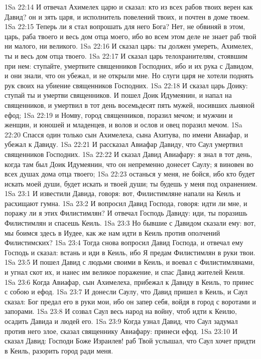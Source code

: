 1Sa 22:14  И отвечал Ахимелех царю и сказал: кто из всех рабов твоих верен как Давид? он и зять царя, и исполнитель повелений твоих, и почтен в доме твоем.
1Sa 22:15  Теперь ли я стал вопрошать для него Бога? Нет, не обвиняй в этом, царь, раба твоего и весь дом отца моего, ибо во всем этом деле не знает раб твой ни малого, ни великого.
1Sa 22:16  И сказал царь: ты должен умереть, Ахимелех, ты и весь дом отца твоего.
1Sa 22:17  И сказал царь телохранителям, стоявшим при нем: ступайте, умертвите священников Господних, ибо и их рука с Давидом, и они знали, что он убежал, и не открыли мне. Но слуги царя не хотели поднять рук своих на убиение священников Господних.
1Sa 22:18  И сказал царь Доику: ступай ты и умертви священников. И пошел Доик Идумеянин, и напал на священников, и умертвил в тот день восемьдесят пять мужей, носивших льняной ефод;
1Sa 22:19  и Номву, город священников, поразил мечом; и мужчин и женщин, и юношей и младенцев, и волов и ослов и овец поразил мечом.
1Sa 22:20  Спасся один только сын Ахимелеха, сына Ахитува, по имени Авиафар, и убежал к Давиду.
1Sa 22:21  И рассказал Авиафар Давиду, что Саул умертвил священников Господних.
1Sa 22:22  И сказал Давид Авиафару: я знал в тот день, когда там был Доик Идумеянин, что он непременно донесет Саулу; я виновен во всех душах дома отца твоего;
1Sa 22:23  останься у меня, не бойся, ибо кто будет искать моей души, будет искать и твоей души; ты будешь у меня под охранением.
1Sa 23:1  И известили Давида, говоря: вот, Филистимляне напали на Кеиль и расхищают гумна.
1Sa 23:2  И вопросил Давид Господа, говоря: идти ли мне, и поражу ли я этих Филистимлян? И отвечал Господь Давиду: иди, ты поразишь Филистимлян и спасешь Кеиль.
1Sa 23:3  Но бывшие с Давидом сказали ему: вот, мы боимся здесь в Иудее, как же нам идти в Кеиль против ополчений Филистимских?
1Sa 23:4  Тогда снова вопросил Давид Господа, и отвечал ему Господь и сказал: встань и иди в Кеиль, ибо Я предам Филистимлян в руки твои.
1Sa 23:5  И пошел Давид с людьми своими в Кеиль, и воевал с Филистимлянами, и угнал скот их, и нанес им великое поражение, и спас Давид жителей Кеиля.
1Sa 23:6  Когда Авиафар, сын Ахимелеха, прибежал к Давиду в Кеиль, то принес с собою и ефод.
1Sa 23:7  И донесли Саулу, что Давид пришел в Кеиль, и Саул сказал: Бог предал его в руки мои, ибо он запер себя, войдя в город с воротами и запорами.
1Sa 23:8  И созвал Саул весь народ на войну, чтоб идти к Кеилю, осадить Давида и людей его.
1Sa 23:9  Когда узнал Давид, что Саул задумал против него злое, сказал священнику Авиафару: принеси ефод.
1Sa 23:10  И сказал Давид: Господи Боже Израилев! раб Твой услышал, что Саул хочет придти в Кеиль, разорить город ради меня.
